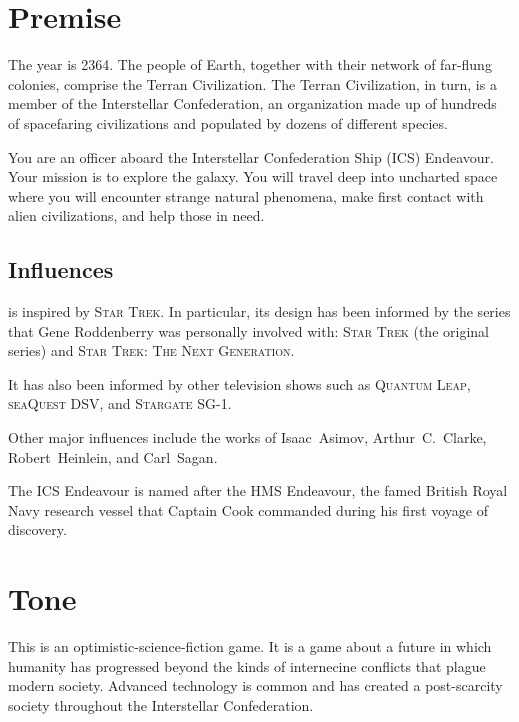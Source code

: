 \documentclass[11pt, a5paper, parskip=half-, DIV=12]{scrartcl}
\begin{document}
\setcounter{page}{1}
\setmainfont{TeX Gyre Schola}
\normalsize
\raggedright



\newpage


\section*{Premise}
The year is 2364.
The people of Earth, together with their network of far-flung colonies, comprise the Terran Civilization. The Terran Civilization, in turn, is a member of the Interstellar Confederation, an organization made up of hundreds of spacefaring civilizations and populated by dozens of different species.

You are an officer aboard the Interstellar Confederation Ship (ICS) Endeavour. Your mission is to explore the galaxy. You will travel deep into uncharted space where you will encounter strange natural phenomena, make first contact with alien civilizations, and help those in need.

\subsection*{Influences}
\ENDEAVOUR{} is inspired by \textsc{Star Trek}. In particular, its design has been informed by the series that Gene Roddenberry was personally involved with: \textsc{Star Trek} (the original series) and \textsc{Star Trek: The Next Generation}.

It has also been informed by other television shows such as \textsc{Quantum Leap}, \textsc{seaQuest DSV}, and \textsc{Stargate SG-1}.

Other major influences include the works of Isaac~Asimov, Arthur~C.~Clarke, Robert~Heinlein, and Carl~Sagan.
 
The ICS Endeavour is named after the HMS Endeavour, the famed British Royal Navy research vessel that Captain Cook commanded during his first voyage of discovery.

\newpage

\section*{Tone}
This is an optimistic-science-fiction game. It is a game about a future in which humanity has progressed beyond the kinds of internecine conflicts that plague modern society. Advanced technology is common and has created a post-scarcity society throughout the Interstellar Confederation.
\end{document}
